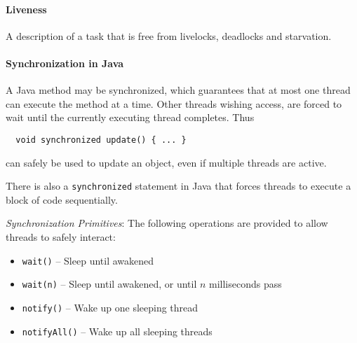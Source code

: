 \paragraph{Liveness} A description of a task that is free from livelocks, deadlocks and starvation.



\paragraph{Synchronization in Java} A Java method may be synchronized, which guarantees that at most one thread can execute the method at a time. Other threads wishing access, are forced to wait until the currently executing thread completes. Thus
%
\begin{lstlisting}
  void synchronized update() { ... }
\end{lstlisting}
%
can safely be used to update an object, even if multiple threads are active.

There is also a \verb|synchronized| statement in Java that forces threads to execute a block of code sequentially.

\textit{Synchronization Primitives}:
The following operations are provided to allow threads to safely interact:
\begin{itemize}[nolistsep,noitemsep]
  \item \verb|wait()| -- Sleep until awakened
  \item\verb|wait(n)| -- Sleep until awakened, or until $n$ milliseconds pass
  \item\verb|notify()| -- Wake up one sleeping thread
  \item \verb|notifyAll()| -- Wake up all sleeping threads
\end{itemize}

